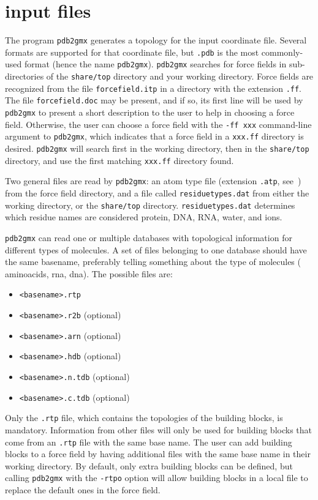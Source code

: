 \section{ input files}
\label{sec:pdb2gmxfiles}
The {\gromacs} program {\tt pdb2gmx} generates a topology for
the input coordinate file. Several formats are supported for
that coordinate file, but {\tt *.pdb} is the most commonly-used format
(hence the name {\tt pdb2gmx}).
{\tt pdb2gmx} searches for force fields in sub-directories of the {\gromacs} {\tt share/top}
directory and your working directory. Force fields are recognized from
the file {\tt forcefield.itp} in a directory with the extension {\tt .ff}.
The file {\tt forcefield.doc} may be present, and if so, its first line
will be used by {\tt pdb2gmx} to present a short description to the
user to help in choosing a force field. Otherwise, the user can
choose a force field with the {\tt -ff xxx} command-line argument
to {\tt pdb2gmx}, which indicates that a force field in a
{\tt xxx.ff} directory is desired. {\tt pdb2gmx} will search first in the
working directory, then in the {\gromacs} {\tt share/top} directory, and
use the first matching {\tt xxx.ff} directory found.

Two general files are read by {\tt pdb2gmx}: an atom type file
(extension {\tt .atp}, see~) from the force field directory,
and a file called {\tt residuetypes.dat} from either the working directory, or
the {\gromacs} {\tt share/top} directory. {\tt residuetypes.dat}
determines which residue names are considered protein, DNA, RNA,
water, and ions.

{\tt pdb2gmx} can read one or multiple databases with topological information
for different types of molecules. A set of files belonging to one database
should have the same basename, preferably telling something about the type
of molecules ({\eg} aminoacids, rna, dna). The possible files are:
\begin{itemize}
\item {\tt <basename>.rtp}
\item {\tt <basename>.r2b} (optional)
\item {\tt <basename>.arn} (optional)
\item {\tt <basename>.hdb} (optional)
\item {\tt <basename>.n.tdb} (optional)
\item {\tt <basename>.c.tdb} (optional)
\end{itemize}
Only the {\tt .rtp} file, which contains the topologies of the building
blocks, is mandatory. Information from other files will only be used 
for building blocks that come from an {\tt .rtp} file with the same base name.
The user can add building blocks to a force field by having additional
files with the same base name in their working directory. By default, only
extra building blocks can be defined, but calling {\tt pdb2gmx} with
the {\tt -rtpo} option will allow building blocks in a local file
to replace the default ones in the force field.

